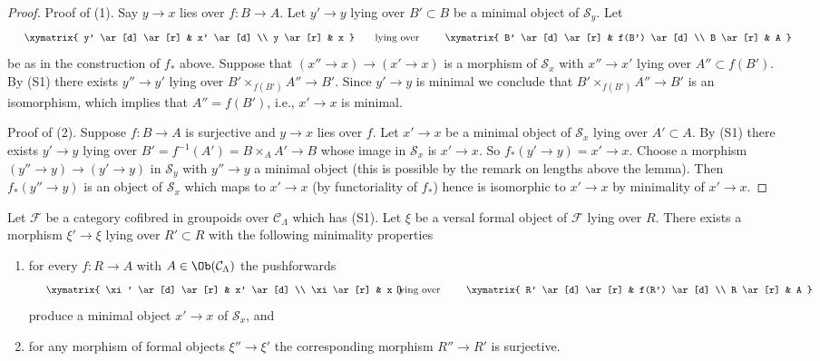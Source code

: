 \begin{proof}
Proof of (1). Say $y \to x$ lies over $f : B \to A$. Let $y' \to y$
lying over $B' \subset B$ be a minimal object of $\mathcal{S}_y$. Let
$$
\vcenter{
\xymatrix{
y' \ar[d] \ar[r] & x' \ar[d] \\
y \ar[r] & x
}
}
\quad\text{lying over}\quad
\vcenter{
\xymatrix{
B' \ar[d] \ar[r] & f(B') \ar[d] \\
B \ar[r] & A
}
}
$$
be as in the construction of $f_*$ above. Suppose that
$(x'' \to x) \to (x' \to x)$ is a morphism of $\mathcal{S}_x$
with $x'' \to x'$ lying over $A'' \subset f(B')$. By (S1)
there exists $y'' \to y'$ lying over $B' \times_{f(B')} A'' \to B'$.
Since $y' \to y$ is minimal we conclude that
$B' \times_{f(B')} A'' \to B'$ is an isomorphism, which implies that
$A'' = f(B')$, i.e., $x' \to x$ is minimal.

\medskip\noindent
Proof of (2). Suppose $f : B \to A$ is surjective and $y \to x$ lies over $f$.
Let $x' \to x$ be a minimal object of $\mathcal{S}_x$ lying over $A' \subset A$.
By (S1) there exists $y' \to y$ lying over
$B' = f^{-1}(A') = B \times_A A' \to B$ whose image in $\mathcal{S}_x$ is
$x' \to x$. So $f_*(y' \to y) = x' \to x$.
Choose a morphism $(y'' \to y) \to (y' \to y)$ in
$\mathcal{S}_y$ with $y'' \to y$ a minimal object (this is possible by
the remark on lengths above the lemma). Then $f_*(y'' \to y)$ is an
object of $\mathcal{S}_x$ which maps to $x' \to x$ (by functoriality of
$f_*$) hence is isomorphic to $x' \to x$ by minimality of $x' \to x$.
\end{proof}

\begin{lemma}
\label{lemma-smallest-where-descends-versal}
Let $\mathcal{F}$ be a category cofibred in groupoids over
$\mathcal{C}_\Lambda$ which has (S1). Let $\xi$ be a versal formal object
of $\mathcal{F}$ lying over $R$. There exists a morphism $\xi' \to \xi$
lying over $R' \subset R$ with the following minimality properties
\begin{enumerate}
\item for every $f : R \to A$ with $A \in \Ob(\mathcal{C}_\Lambda)$
the pushforwards
$$
\vcenter{
\xymatrix{
\xi' \ar[d] \ar[r] & x' \ar[d] \\
\xi \ar[r] & x
}
}
\quad\text{lying over}\quad
\vcenter{
\xymatrix{
R' \ar[d] \ar[r] & f(R') \ar[d] \\
R \ar[r] & A
}
}
$$
produce a minimal object $x' \to x$ of $\mathcal{S}_x$, and
\item for any morphism of formal objects $\xi'' \to \xi'$
the corresponding morphism $R'' \to R'$ is surjective.
\end{enumerate}
\end{lemma}

